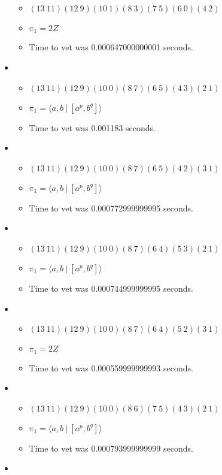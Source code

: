 \documentclass{article}
\begin{document}
\begin{itemize}
\begin{itemize}
      \item $(13\ 11)(12\ 9)(10\ 1)(8\ 3)(7\ 5)(6\ 0)(4\ 2)$
      \item $\pi_1 =2 Z$
      \item Time to vet was 0.000647000000001 seconds.
\end{itemize}
\item \begin{itemize}
      \item $(13\ 11)(12\ 9)(10\ 0)(8\ 7)(6\ 5)(4\ 3)(2\ 1)$
      \item $\pi_1 = \langle a,b\ |\ [a^p,b^q]\rangle$
      \item Time to vet was 0.001183 seconds.
\end{itemize}
\item \begin{itemize}
      \item $(13\ 11)(12\ 9)(10\ 0)(8\ 7)(6\ 5)(4\ 2)(3\ 1)$
      \item $\pi_1 = \langle a,b\ |\ [a^p,b^q]\rangle$
      \item Time to vet was 0.000772999999995 seconds.
\end{itemize}
\item \begin{itemize}
      \item $(13\ 11)(12\ 9)(10\ 0)(8\ 7)(6\ 4)(5\ 3)(2\ 1)$
      \item $\pi_1 = \langle a,b\ |\ [a^p,b^q]\rangle$
      \item Time to vet was 0.000744999999995 seconds.
\end{itemize}
\item \begin{itemize}
      \item $(13\ 11)(12\ 9)(10\ 0)(8\ 7)(6\ 4)(5\ 2)(3\ 1)$
      \item $\pi_1 =2 Z$
      \item Time to vet was 0.000559999999993 seconds.
\end{itemize}
\item \begin{itemize}
      \item $(13\ 11)(12\ 9)(10\ 0)(8\ 6)(7\ 5)(4\ 3)(2\ 1)$
      \item $\pi_1 = \langle a,b\ |\ [a^p,b^q]\rangle$
      \item Time to vet was 0.000793999999999 seconds.
\end{itemize}
\item \begin{itemize}

\end{itemize}
\end{itemize}
\end{document}
